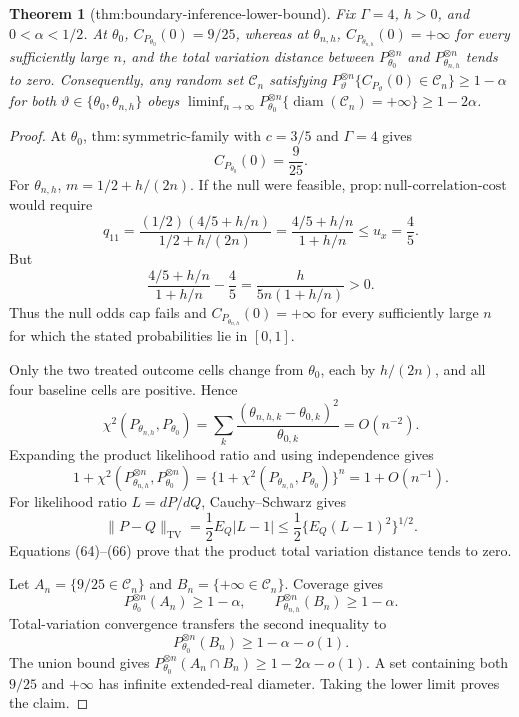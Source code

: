 \documentclass{article}
\newtheorem{theorem}{Theorem}
\begin{document}
\begin{theorem}[thm:boundary-inference-lower-bound]\label{thm:boundary-inference-lower-bound}
Fix \(\Gamma=4\), \(h>0\), and \(0<\alpha<1/2\). At \(\theta_0\), \(C_{P_{\theta_0}}(0)=9/25\), whereas at \(\theta_{n,h}\), \(C_{P_{\theta_{n,h}}}(0)=+\infty\) for every sufficiently large \(n\), and the total variation distance between \(P_{\theta_0}^{\otimes n}\) and \(P_{\theta_{n,h}}^{\otimes n}\) tends to zero. Consequently, any random set \(\mathcal C_n\) satisfying \(P_{\vartheta}^{\otimes n}\{C_{P_{\vartheta}}(0)\in\mathcal C_n\}\geq1-\alpha\) for both \(\vartheta\in\{\theta_0,\theta_{n,h}\}\) obeys \(\liminf_{n\to\infty}P_{\theta_0}^{\otimes n}\{\operatorname{diam}(\mathcal C_n)=+\infty\}\geq1-2\alpha\).
\end{theorem}
\begin{proof}
At \(\theta_0\), \(\mathrm{thm{:}symmetric\mbox{-}family}\) with \(c=3/5\) and \(\Gamma=4\) gives
\[
C_{P_{\theta_0}}(0)=\frac9{25}. \tag{61}
\]
For \(\theta_{n,h}\), \(m=1/2+h/(2n)\). If the null were feasible, \(\mathrm{prop{:}null\mbox{-}correlation\mbox{-}cost}\) would require
\[
q_{11}=\frac{(1/2)(4/5+h/n)}{1/2+h/(2n)}
=\frac{4/5+h/n}{1+h/n}\leq u_x=\frac45. \tag{62}
\]
But
\[
\frac{4/5+h/n}{1+h/n}-\frac45
=\frac{h}{5n(1+h/n)}>0. \tag{63}
\]
Thus the null odds cap fails and \(C_{P_{\theta_{n,h}}}(0)=+\infty\) for every sufficiently large \(n\) for which the stated probabilities lie in \([0,1]\).

Only the two treated outcome cells change from \(\theta_0\), each by \(h/(2n)\), and all four baseline cells are positive. Hence
\[
\chi^2(P_{\theta_{n,h}},P_{\theta_0})
=\sum_k\frac{(\theta_{n,h,k}-\theta_{0,k})^2}{\theta_{0,k}}
=O(n^{-2}). \tag{64}
\]
Expanding the product likelihood ratio and using independence gives
\[
1+\chi^2(P_{\theta_{n,h}}^{\otimes n},P_{\theta_0}^{\otimes n})
=\{1+\chi^2(P_{\theta_{n,h}},P_{\theta_0})\}^{n}
=1+O(n^{-1}). \tag{65}
\]
For likelihood ratio \(L=dP/dQ\), Cauchy--Schwarz gives
\[
\|P-Q\|_{\mathrm{TV}}
=\frac12E_Q|L-1|
\leq\frac12\{E_Q(L-1)^2\}^{1/2}. \tag{66}
\]
Equations (64)--(66) prove that the product total variation distance tends to zero.

Let \(A_n=\{9/25\in\mathcal C_n\}\) and \(B_n=\{+\infty\in\mathcal C_n\}\). Coverage gives
\[
P_{\theta_0}^{\otimes n}(A_n)\geq1-\alpha,\qquad
P_{\theta_{n,h}}^{\otimes n}(B_n)\geq1-\alpha. \tag{67}
\]
Total-variation convergence transfers the second inequality to
\[
P_{\theta_0}^{\otimes n}(B_n)\geq1-\alpha-o(1). \tag{68}
\]
The union bound gives \(P_{\theta_0}^{\otimes n}(A_n\cap B_n)\geq1-2\alpha-o(1)\). A set containing both \(9/25\) and \(+\infty\) has infinite extended-real diameter. Taking the lower limit proves the claim.
\end{proof}
\end{document}
